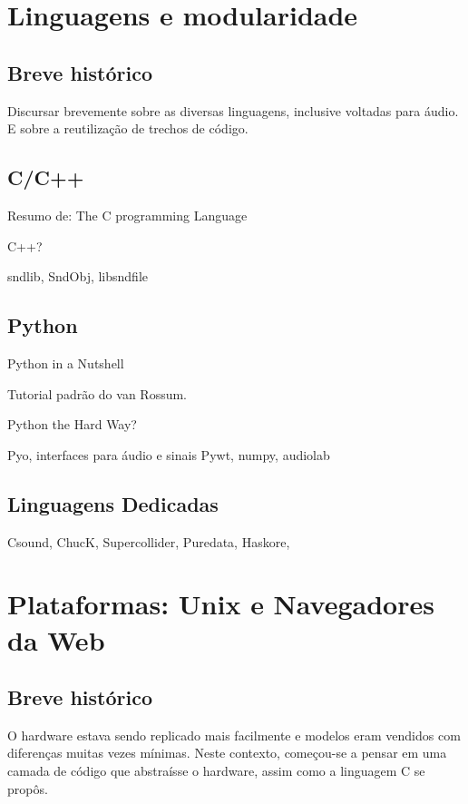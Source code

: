 \section{Linguagens e modularidade}

\subsection{Breve histórico}

Discursar brevemente sobre as diversas linguagens,
inclusive voltadas para áudio. E sobre a reutilização
de trechos de código.

\subsection{C/C++}

Resumo de:
The C programming Language

C++?

sndlib, SndObj, libsndfile

\subsection{Python}

Python in a Nutshell

Tutorial padrão do van Rossum.

Python the Hard Way?

Pyo, interfaces para áudio e sinais Pywt, numpy, audiolab

\subsection{Linguagens Dedicadas}

Csound, ChucK, Supercollider, Puredata, Haskore, 

\section{Plataformas: Unix e Navegadores da Web}

\subsection{Breve histórico}

O hardware estava sendo replicado mais facilmente e
modelos eram vendidos com diferenças
muitas vezes mínimas. Neste contexto, começou-se a
pensar em uma camada de código que abstraísse o hardware, assim
como a linguagem C se propôs.

